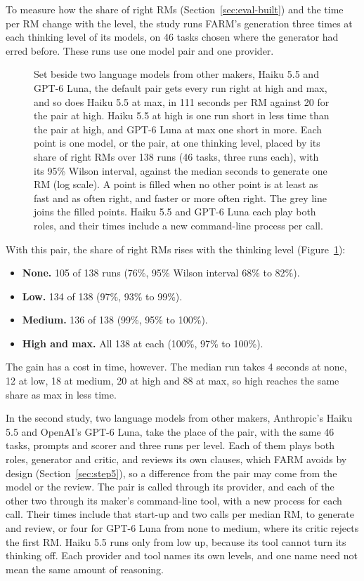 \documentclass[11pt,english,listoffigures,listoftables]{tfgetsinf}
\begin{document}
To measure how the share of right RMs (Section~\ref{sec:eval-built}) and the time per RM change with the level, the study runs FARM's generation three times at each thinking level of its models, on 46 tasks chosen where the generator had erred before. These runs use one model pair and one provider.
\begin{figure}[!htb]
\centering

\caption[Right RMs per model and thinking level]{Set beside two language models from other makers, Haiku 5.5 and GPT-6 Luna, the default pair gets every run right at high and max, and so does Haiku 5.5 at max, in 111 seconds per RM against 20 for the pair at high. Haiku 5.5 at high is one run short in less time than the pair at high, and GPT-6 Luna at max one short in more. Each point is one model, or the pair, at one thinking level, placed by its share of right RMs over 138 runs (46 tasks, three runs each), with its 95\% Wilson interval, against the median seconds to generate one RM (log scale). A point is filled when no other point is at least as fast and as often right, and faster or more often right. The grey line joins the filled points. Haiku 5.5 and GPT-6 Luna each play both roles, and their times include a new command-line process per call.}
\label{fig:res-thinking}
\end{figure}
With this pair, the share of right RMs rises with the thinking level (Figure~\ref{fig:res-thinking}):
\begin{itemize}
    \item \textbf{None.} 105 of 138 runs (76\%, 95\% Wilson interval 68\% to 82\%).
    \item \textbf{Low.} 134 of 138 (97\%, 93\% to 99\%).
    \item \textbf{Medium.} 136 of 138 (99\%, 95\% to 100\%).
    \item \textbf{High and max.} All 138 at each (100\%, 97\% to 100\%).
\end{itemize}
The gain has a cost in time, however. The median run takes 4 seconds at none, 12 at low, 18 at medium, 20 at high and 88 at max, so high reaches the same share as max in less time.

In the second study, two language models from other makers, Anthropic's Haiku 5.5 and OpenAI's GPT-6 Luna, take the place of the pair, with the same 46 tasks, prompts and scorer and three runs per level. Each of them plays both roles, generator and critic, and reviews its own clauses, which FARM avoids by design (Section~\ref{sec:step5}), so a difference from the pair may come from the model or the review. The pair is called through its provider, and each of the other two through its maker's command-line tool, with a new process for each call. Their times include that start-up and two calls per median RM, to generate and review, or four for GPT-6 Luna from none to medium, where its critic rejects the first RM. Haiku 5.5 runs only from low up, because its tool cannot turn its thinking off. Each provider and tool names its own levels, and one name need not mean the same amount of reasoning.
\end{document}
